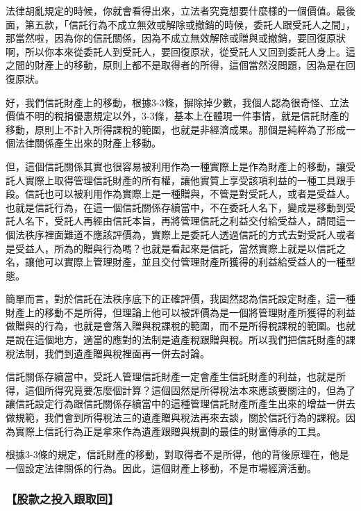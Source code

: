 \documentclass[oneside,sub3section]{ctexbook}
\begin{document}
法律胡亂規定的時候，你就會看得出來，立法者究竟想要什麼樣的一個價值。最後面，第五款，「信託行為不成立無效或解除或撤銷的時候，委託人跟受託人之間」，那當然啦，因為你的信託關係，因為不成立無效解除或贈與或撤銷，要回復原狀啊，所以你本來從委託人到受託人，要回復原狀，從受託人又回到委託人身上。這之間的財產上的移動，原則上都不是取得者的所得，這個當然沒問題，因為是在回復原狀。

好，我們信託財產上的移動，根據3-3條，摒除掉少數，我個人認為很奇怪、立法價值不明的稅捐優惠規定以外，3-3條，基本上在體現一件事情，就是信託財產的移動，原則上不計入所得課稅的範圍，也就是非經濟成果。那個是純粹為了形成一個法律關係產生出來的財產上移動。

但，這個信託關係其實也很容易被利用作為一種實際上是作為財產上的移動，讓受託人實際上取得管理信託財產的所有權，讓他實質上享受該項利益的一種工具跟手段。信託也可以被利用作為實際上是一種贈與，不管是對受託人，或者是受益人。也就是信託行為，在這一個信託關係存續當中，不在委託人名下，變成是移動到受託人名下，受託人再經由信託本旨，再將管理信託之利益交付給受益人，請問這一個法秩序裡面難道不應該評價為，實際上是委託人透過信託的方式去對受託人或者是受益人，所為的贈與行為嗎？也就是看起來是信託，當然實際上就是以信託之名，讓他可以實際上管理財產，並且交付管理財產所獲得的利益給受益人的一種型態。

簡單而言，對於信託在法秩序底下的正確評價，我固然認為信託設定財產，這一種財產上的移動不是所得，但理論上他可以被評價為是一個將管理財產所獲得的利益做贈與的行為，也就是會落入贈與稅課稅的範圍，而不是所得稅課稅的範圍。也就是說在這個地方，適當的應對的法制是遺產稅跟贈與稅。所以我們把信託財產的課稅法制，我們到遺產贈與稅裡面再一併去討論。

信託關係存續當中，受託人管理信託財產一定會產生信託財產的利益，也就是所得，這個所得究竟要怎麼個計算？這個固然是所得稅法本來應該要關注的，但為了讓信託設定行為跟信託關係存續當中的這種管理信託財產所產生出來的增益一併去做規範，我們會到所得稅法三的遺產贈與稅法再來去談，關於信託行為的課稅。因為實際上信託行為正是拿來作為遺產跟贈與規劃的最佳的財富傳承的工具。

根據3-3條的規定，信託財產的移動，對取得者不是所得，他的背後原理在，他是一個設定法律關係的行為。因此，這個財產上移動，不是市場經濟活動。

\hypertarget{ux80a1ux6b3eux4e4bux6295ux5165ux8ddfux53d6ux56de}{%
\subsubsection{【股款之投入跟取回】}\label{ux80a1ux6b3eux4e4bux6295ux5165ux8ddfux53d6ux56de}}
\end{document}
